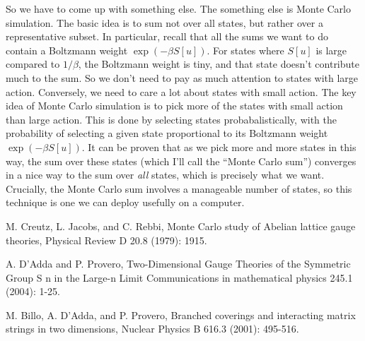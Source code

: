 \documentclass[9pt,twocolumn,twoside]{article}
\begin{document}
So we have to come up with something else.  The something else is Monte Carlo simulation.  The basic idea is to sum not over all states, but rather over a representative subset.  In particular, recall that all the sums we want to do contain a Boltzmann weight $\exp(-\beta S[u])$.  For states where $S[u]$ is large compared to $1/\beta$, the Boltzmann weight is tiny, and that state doesn't contribute much to the sum.  So we don't need to pay as much attention to states with large action.  Conversely, we need to care a lot about states with small action.  The key idea of Monte Carlo simulation is to pick more of the states with small action than large action.  This is done by selecting states probabalistically, with the probability of selecting a given state proportional to its Boltzmann weight $\exp(-\beta S[u])$.  It can be proven that as we pick more and more states in this way, the sum over these states (which I'll call the ``Monte Carlo sum'') converges in a nice way to the sum over \textit{all} states, which is precisely what we want.  Crucially, the Monte Carlo sum involves a manageable number of states, so this technique is one we can deploy usefully on a computer. 





\begin{thebibliography}{9}

	M. Creutz, L. Jacobs, and C. Rebbi, 
	Monte Carlo study of Abelian lattice gauge theories, 
	Physical Review D 20.8 (1979): 1915.

	A. D’Adda and P. Provero,
	Two-Dimensional Gauge Theories of the Symmetric Group S n in the Large-n Limit
	Communications in mathematical physics 245.1 (2004): 1-25.

	M. Billo, A. D'Adda, and P. Provero,
	Branched coverings and interacting matrix strings in two dimensions,
	Nuclear Physics B 616.3 (2001): 495-516.


\end{thebibliography}
\end{document}
